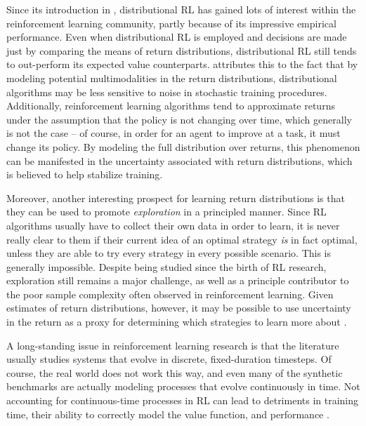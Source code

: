 Since its introduction in \citet{Bellemare2017ADP}, distributional RL
has gained lots of interest within the reinforcement learning
community, partly because of its impressive empirical
performance. Even when distributional RL is employed and decisions are
made just by comparing the means of return distributions,
distributional RL still tends to out-perform its expected value
counterparts. \citet{Bellemare2017ADP} attributes this to the fact
that by modeling potential multimodalities in the return
distributions, distributional algorithms may be less sensitive to
noise in stochastic training procedures. Additionally, reinforcement learning
algorithms tend to approximate returns under the assumption that the policy is
not changing over time, which generally is not the case -- of course, in order
for an agent to improve at a task, it must change its policy. By modeling the
full distribution over returns, this phenomenon can be manifested in the
uncertainty associated with return distributions, which is believed to help
stabilize training.

Moreover, another interesting prospect for learning return
distributions is that they can be used to promote \emph{exploration}
in a principled manner. Since RL algorithms usually have to collect
their own data in order to learn, it is never really clear to them if
their current idea of an optimal strategy \emph{is} in fact optimal,
unless they are able to try every strategy in every possible
scenario. This is generally impossible. Despite being studied since
the birth of RL research, exploration still remains a major
challenge, as well as a principle contributor to the poor sample
complexity often observed in reinforcement learning. Given estimates
of return distributions, however, it may be possible to use
uncertainty in the return as a proxy for determining which strategies
to learn more about \citep{mavrin2019distributional}.

A long-standing issue in reinforcement learning research is that
the literature usually studies systems that evolve in discrete,
fixed-duration timesteps. Of course, the real world does not work this
way, and even many of the synthetic benchmarks are actually modeling processes
that evolve continuously in time. Not accounting for continuous-time
processes in RL can lead to detriments in training time, their ability
to correctly model the value function, and performance
\citep{doya2000reinforcement, Munos2004ASO, tallec2019making}.

